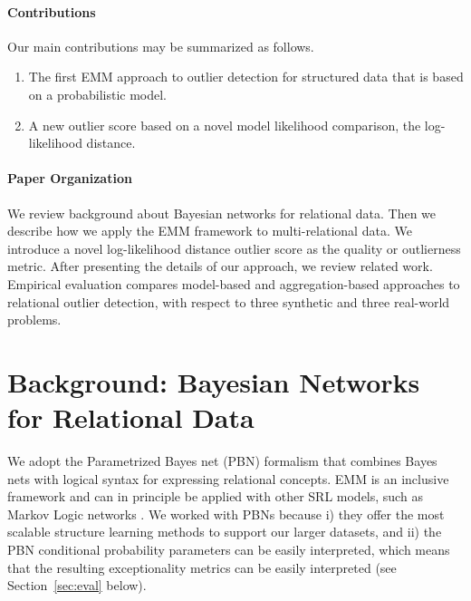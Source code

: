 \documentclass[conference]{IEEEtran}
\begin{document}
\paragraph{Contributions} Our main contributions may be 
 summarized as follows.

\begin{enumerate} 
	\item The first EMM approach to outlier detection for structured data that is based on a probabilistic model. 
	\item A new outlier score based on a novel model likelihood comparison, the log-likelihood distance.  %
	\end{enumerate}

\paragraph{Paper Organization} We review background about Bayesian networks for relational data. Then we describe how we apply the EMM framework to multi-relational data. We introduce a novel log-likelihood distance outlier score as the quality or outlierness metric. After presenting the details of our approach, we review related work. Empirical evaluation compares model-based and aggregation-based approaches to relational outlier detection, with respect to three synthetic and three real-world problems.




\section{Background: Bayesian Networks for Relational Data}
We adopt  
 the Parametrized Bayes net (PBN) formalism \cite{Poole2003} that combines Bayes nets with logical syntax for expressing relational concepts. EMM is an inclusive framework and can in principle be applied with other SRL models, such as Markov Logic networks \cite{Domingos2009}. We worked with PBNs because i) they offer the most scalable structure learning methods \cite{Schulte2012a} to support our larger datasets, and ii) the PBN conditional probability parameters can be easily interpreted, which means that the resulting exceptionality metrics can be easily interpreted  (see Section~\ref{sec:eval} below).
\end{document}
